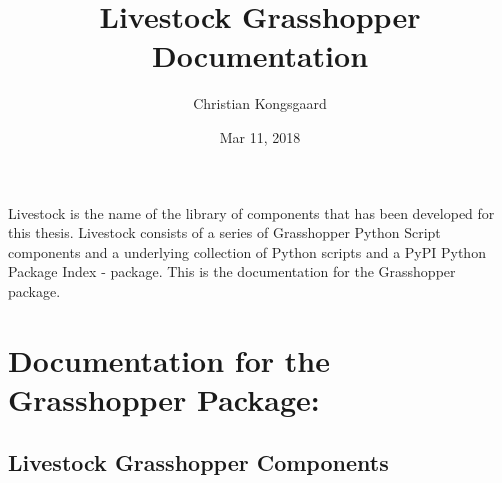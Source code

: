 \documentclass[letterpaper,10pt,english]{sphinxmanual}
\title{Livestock Grasshopper Documentation}
\date{Mar 11, 2018}
\author{Christian Kongsgaard}
\begin{document}
\maketitle
\sphinxtableofcontents
{}\label{\detokenize{index::doc}}


Livestock is the name of the library of components that has been developed for this thesis.
Livestock consists of a series of Grasshopper Python Script components and a underlying collection of Python scripts
and a PyPI \textendash{} Python Package Index - package. This is the documentation for the Grasshopper package.


\chapter{Documentation for the Grasshopper Package:}
\label{\detokenize{index:welcome-to-livestock-gh-s-documentation}}\label{\detokenize{index:documentation-for-the-grasshopper-package}}

\section{Livestock Grasshopper Components}
\label{\detokenize{components:livestock-grasshopper-components}}\label{\detokenize{components::doc}}
\end{document}
